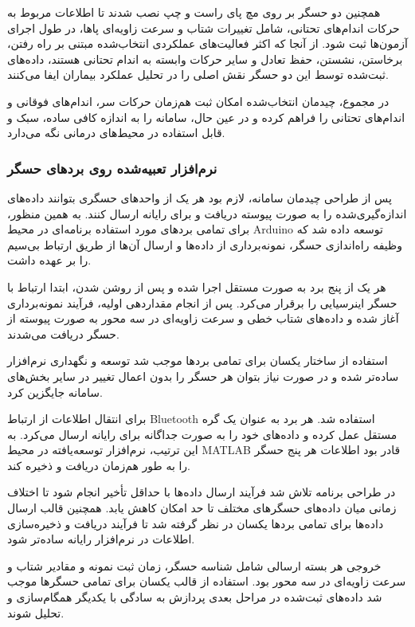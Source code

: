 همچنین دو حسگر بر روی مچ پای راست و چپ نصب شدند تا اطلاعات مربوط به حرکات اندام‌های تحتانی، شامل تغییرات شتاب و سرعت زاویه‌ای پاها، در طول اجرای آزمون‌ها ثبت شود. از آنجا که اکثر فعالیت‌های عملکردی انتخاب‌شده مبتنی بر راه رفتن، برخاستن، نشستن، حفظ تعادل و سایر حرکات وابسته به اندام تحتانی هستند، داده‌های ثبت‌شده توسط این دو حسگر نقش اصلی را در تحلیل عملکرد بیماران ایفا می‌کنند.

در مجموع، چیدمان انتخاب‌شده امکان ثبت هم‌زمان حرکات سر، اندام‌های فوقانی و اندام‌های تحتانی را فراهم کرده و در عین حال، سامانه را به اندازه کافی ساده، سبک و قابل استفاده در محیط‌های درمانی نگه می‌دارد.


\subsubsection{نرم‌افزار تعبیه‌شده روی بردهای حسگر}

پس از طراحی چیدمان سامانه، لازم بود هر یک از واحدهای حسگری بتوانند داده‌های اندازه‌گیری‌شده را به صورت پیوسته دریافت و برای رایانه ارسال کنند. به همین منظور، برای تمامی بردهای مورد استفاده برنامه‌ای در محیط Arduino توسعه داده شد که وظیفه راه‌اندازی حسگر، نمونه‌برداری از داده‌ها و ارسال آن‌ها از طریق ارتباط بی‌سیم را بر عهده داشت.

هر یک از پنج برد به صورت مستقل اجرا شده و پس از روشن شدن، ابتدا ارتباط با حسگر اینرسیایی را برقرار می‌کرد. پس از انجام مقداردهی اولیه، فرآیند نمونه‌برداری آغاز شده و داده‌های شتاب خطی و سرعت زاویه‌ای در سه محور به صورت پیوسته از حسگر دریافت می‌شدند.

استفاده از ساختار یکسان برای تمامی بردها موجب شد توسعه و نگهداری نرم‌افزار ساده‌تر شده و در صورت نیاز بتوان هر حسگر را بدون اعمال تغییر در سایر بخش‌های سامانه جایگزین کرد.


برای انتقال اطلاعات از ارتباط Bluetooth استفاده شد. هر برد به عنوان یک گره مستقل عمل کرده و داده‌های خود را به صورت جداگانه برای رایانه ارسال می‌کرد. به این ترتیب، نرم‌افزار توسعه‌یافته در محیط MATLAB قادر بود اطلاعات هر پنج حسگر را به طور هم‌زمان دریافت و ذخیره کند.

در طراحی برنامه تلاش شد فرآیند ارسال داده‌ها با حداقل تأخیر انجام شود تا اختلاف زمانی میان داده‌های حسگرهای مختلف تا حد امکان کاهش یابد. همچنین قالب ارسال داده‌ها برای تمامی بردها یکسان در نظر گرفته شد تا فرآیند دریافت و ذخیره‌سازی اطلاعات در نرم‌افزار رایانه ساده‌تر شود.

خروجی هر بسته ارسالی شامل شناسه حسگر، زمان ثبت نمونه و مقادیر شتاب و سرعت زاویه‌ای در سه محور بود. استفاده از قالب یکسان برای تمامی حسگرها موجب شد داده‌های ثبت‌شده در مراحل بعدی پردازش به سادگی با یکدیگر همگام‌سازی و تحلیل شوند.

